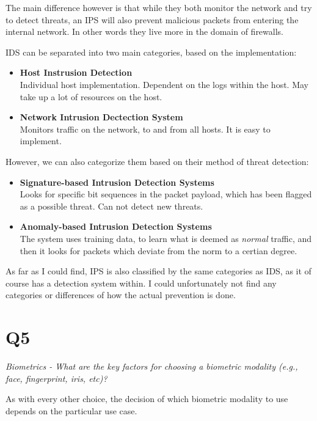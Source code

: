 \documentclass{article}
\begin{document}
The main difference however is that while they both monitor the network and try to detect threats, an IPS will also prevent malicious packets from entering the internal network. In other words they live more in the domain of firewalls.

IDS can be separated into two main categories, based on the implementation:
\begin{itemize}
  \item{\textbf{Host Instrusion Detection}\\Individual host implementation. Dependent on the logs within the host. May take up a lot of resources on the host.}
  \item{\textbf{Network Intrusion Dectection System}\\Monitors traffic on the network, to and from all hosts. It is easy to implement.}
\end{itemize}

However, we can also categorize them based on their method of threat detection:
\begin{itemize}
  \item{\textbf{Signature-based Intrusion Detection Systems}\\Looks for specific bit sequences in the packet payload, which has been flagged as a possible threat. Can not detect new threats.}
  \item{\textbf{Anomaly-based Intrusion Detection Systems}\\The system uses training data, to learn what is deemed as \textit{normal} traffic, and then it looks for packets which deviate from the norm to a certian degree.}
\end{itemize}

As far as I could find, IPS is also classified by the same categories as IDS, as it of course has a detection system within. I could unfortunately not find any categories or differences of how the actual prevention is done.

\newpage
\section{Q5}
\begin{tcolorbox}
  \textit{Biometrics - What are the key factors for choosing a biometric modality (e.g., face, fingerprint, iris, etc)?}
\end{tcolorbox}
As with every other choice, the decision of which biometric modality to use depends on the particular use case.
\end{document}

